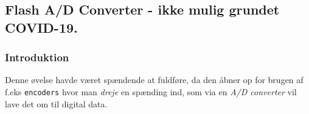 \subsection{Flash A/D Converter - ikke mulig grundet COVID-19.}

\subsubsection{Introduktion}
Denne øvelse havde været spændende at fuldføre, da den åbner op for brugen af f.eks \texttt{encoders} hvor man \emph{dreje} en spænding ind, som via en \emph{A/D converter} vil lave det om til digital data.
